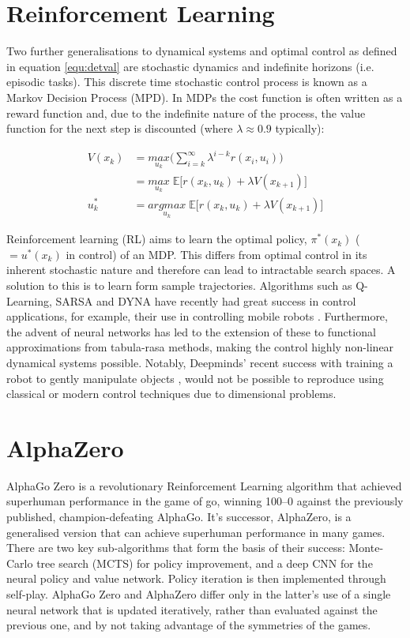 \documentclass[main.tex]{subfiles}
\begin{document}
\section{Reinforcement Learning}
Two further generalisations to dynamical systems and optimal control as defined in equation \ref{equ:detval} are stochastic dynamics and indefinite horizons (i.e. episodic tasks). This discrete time stochastic control process is known as a Markov Decision Process (MPD). In MDPs the cost function is often written as a reward function and, due to the indefinite nature of the process, the value function for the next step is discounted (where $\lambda \approx 0.9$ typically):

\begin{align}
    \label{equ:mdpval} 
    V(x_k) & = \underset{u_k}{max} \bigg( \sum_{i=k}^{\infty} \lambda^{i-k} r(x_i, u_i) \bigg) \\ 
    & = \underset{u_k}{max} \; \mathbb{E} \Big[ r(x_k, u_k) + \lambda V(x_{k+1}) \Big] \\
    u^{*}_k & = \underset{u_k}{argmax}\; \mathbb{E} \Big[ r(x_k, u_k) + \lambda V(x_{k+1}) \Big]
\end{align}

Reinforcement learning (RL) aims to learn the optimal policy, $\pi^{*}(x_k)$ ($=u^{*}(x_k)$ in control) of an MDP. This differs from optimal control in its inherent stochastic nature and therefore can lead to intractable search spaces. A solution to this is to learn form sample trajectories. Algorithms such as Q-Learning, SARSA and DYNA have recently had great success in control applications, for example, their use in controlling mobile robots \cite{Qlearning, RLoverview}. Furthermore, the advent of neural networks has led to the extension of these to functional approximations from tabula-rasa methods, making the control highly non-linear dynamical systems possible. Notably, Deepminds' recent success with training a robot to gently manipulate objects \cite{Robothand}, would not be possible to reproduce using classical or modern control techniques due to dimensional problems.

\section{AlphaZero}
AlphaGo Zero is a revolutionary Reinforcement Learning algorithm that achieved superhuman performance in the game of go, winning 100–0 against the previously published, champion-defeating AlphaGo. It's successor, AlphaZero, is a generalised version that can achieve superhuman performance in many games. There are two key sub-algorithms that form the basis of their success: Monte-Carlo tree search (MCTS) for policy improvement, and a deep CNN for the neural policy and value network. Policy iteration is then implemented through self-play. AlphaGo Zero and AlphaZero differ only in the latter's use of a single neural network that is updated iteratively, rather than evaluated against the previous one, and by not taking advantage of the symmetries of the games.
\end{document}
